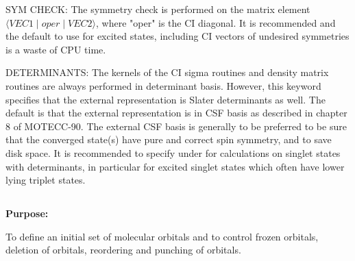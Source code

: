 SYM CHECK: The symmetry check is performed on the matrix element
$\langle VEC1 \mid oper \mid VEC2\rangle$, where "oper" is
the CI diagonal.
It is recommended and the default to use 
for excited states, including
CI vectors of undesired symmetries is a waste of CPU time.

DETERMINANTS: The kernels of the CI sigma routines and density matrix
routines are always performed in determinant
basis.  However, this
keyword specifies that the external representation is Slater
determinants as well.  The default is that the external representation
is in CSF basis as
described in chapter 8 of MOTECC-90.  The external
CSF basis is
generally to be preferred to be sure that the converged
state(s) have pure and correct spin symmetry, and
to save disk space.
It is recommended to specify  under
 for
calculations on singlet states with
determinants,
in particular for
excited singlet states which often have lower lying triplet states.


\pagebreak[3]
\subsection{\label{ref-orbinp}}

{\bf Purpose:}

To define an initial set of molecular orbitals
and to control frozen orbitals, deletion of orbitals,
reordering and punching of orbitals.

